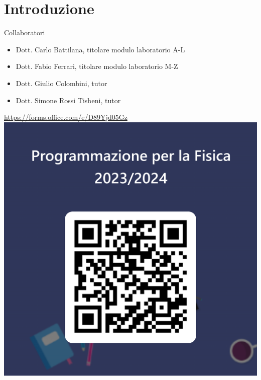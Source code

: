 
\section*{\color{white}Introduzione}

\begin{frame}{Collaboratori}

  \begin{itemize}
  \item Dott. Carlo Battilana, titolare modulo laboratorio A-L
  \item Dott. Fabio Ferrari, titolare modulo laboratorio M-Z
  \item Dott. Giulio Colombini, tutor
  \item Dott. Simone Rossi Tisbeni, tutor
  \end{itemize}

\end{frame}

\begin{frame}
  \begin{center}
    \vfill
    \url{https://forms.office.com/e/D89Yjd05Gz}
    \vfill
    \includegraphics[trim={400 200 400 600},clip,height=.6\textheight]{images/sondaggio-qr.png}
    \vfill
  \end{center}
\end{frame}

